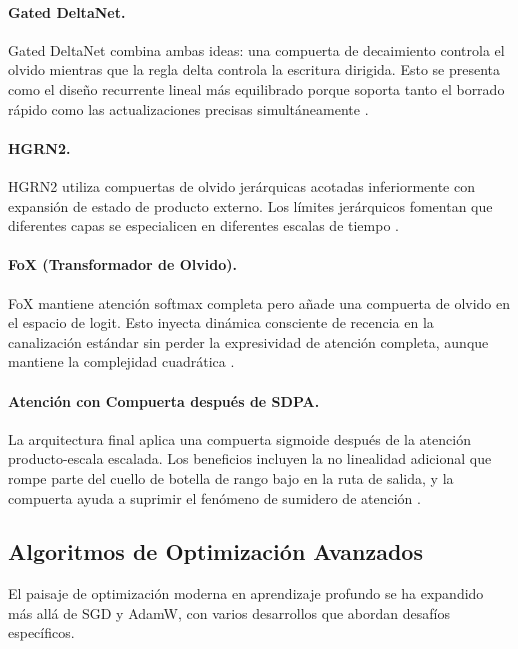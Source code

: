 \documentclass[11pt,a4paper]{article}
\begin{document}
\paragraph{Gated DeltaNet.}
Gated DeltaNet combina ambas ideas: una compuerta de decaimiento controla el olvido mientras que la regla delta controla la escritura dirigida. Esto se presenta como el diseño recurrente lineal más equilibrado porque soporta tanto el borrado rápido como las actualizaciones precisas simultáneamente \citep{yang_gated_deltanet_2024}.

\paragraph{HGRN2.}
HGRN2 utiliza compuertas de olvido jerárquicas acotadas inferiormente con expansión de estado de producto externo. Los límites jerárquicos fomentan que diferentes capas se especialicen en diferentes escalas de tiempo \citep{qin_hgrn2_2024}.

\paragraph{FoX (Transformador de Olvido).}
FoX mantiene atención softmax completa pero añade una compuerta de olvido en el espacio de logit. Esto inyecta dinámica consciente de recencia en la canalización estándar sin perder la expresividad de atención completa, aunque mantiene la complejidad cuadrática \citep{lin_forgetting_transformer_2025}.

\paragraph{Atención con Compuerta después de SDPA.}
La arquitectura final aplica una compuerta sigmoide después de la atención producto-escala escalada. Los beneficios incluyen la no linealidad adicional que rompe parte del cuello de botella de rango bajo en la ruta de salida, y la compuerta ayuda a suprimir el fenómeno de sumidero de atención \citep{qiu_gated_attention_2025}.

\subsection{Algoritmos de Optimización Avanzados}

El paisaje de optimización moderna en aprendizaje profundo se ha expandido más allá de SGD y AdamW, con varios desarrollos que abordan desafíos específicos.
\end{document}

